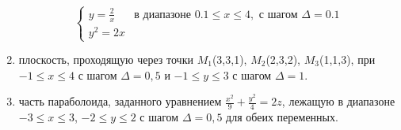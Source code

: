 \begin{enumerate}
\begin{item}
		\[
			\begin{cases}
			    y = \frac{2}{x} & \text{в диапазоне } 0.1 \leq x \leq 4, \text{ с шагом } \Delta = 0.1 \\
			    y^2 = 2x
			\end{cases}
		\]
	\end{item}
    \item{} плоскость, проходящую через точки $M_1$(3,3,1), $M_2$(2,3,2), $M_3$(1,1,3), при $-1 \leq x \leq 4$ с шагом $\Delta = 0,5$ и $-1 \leq y \leq 3$ с шагом $\Delta = 1$.
    \item{} часть параболоида, заданного уравнением $\frac{x^2}{9} + \frac{y^2}{4} = 2z$, лежащую в диапазоне $-3 \leq x \leq 3$, $-2 \leq y \leq 2$ с шагом $\Delta = 0,5$ для обеих переменных.
\end{enumerate}